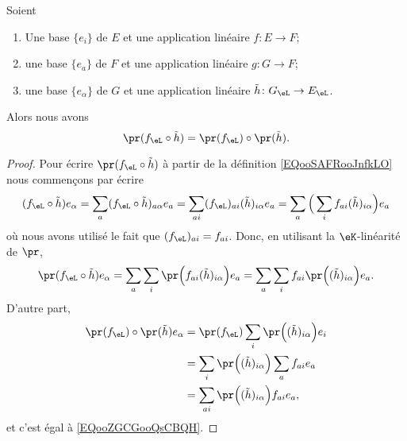 \begin{lemma}       \label{LEMooWZGSooONEnjZ}
    Soient
    \begin{enumerate}
        \item
            Une base \( \{ e_i \}\) de \( E\) et une application linéaire \( f\colon E\to F\);
        \item
            une base \( \{ e_a \}\) de \( F\) et une application linéaire \( g\colon G\to F\);
        \item
            une base \( \{ e_{\alpha} \} \) de \( G\) et une application linéaire \( \tilde h\colon G_{\eL}\to E_{\eL}\).
    \end{enumerate}
    Alors nous avons
    \begin{equation}
        \pr(f_{\eL}\circ \tilde h)=\pr(f_{\eL})\circ\pr(\tilde h).
    \end{equation}
\end{lemma}

\begin{proof}
    Pour écrire \( \pr(f_{\eL}\circ \tilde h)\) à partir de la définition \eqref{EQooSAFRooJnfkLO} nous commençons par écrire
    \begin{equation}
        (f_{\eL}\circ \tilde h)e_{\alpha}=\sum_a(f_{\eL}\circ \tilde h)_{a\alpha}e_a=\sum_{ai}(f_{\eL})_{ai}(\tilde h)_{i\alpha}e_a=\sum_a\Big( \sum_{i}f_{ai}(\tilde h)_{i\alpha} \Big)e_a
    \end{equation}
    où nous avons utilisé le fait que \( (f_{\eL})_{ai}=f_{ai}\). Donc, en utilisant la \( \eK\)-linéarité de \( \pr\),
    \begin{equation}        \label{EQooZGCGooQsCBQH}
        \pr(f_{\eL}\circ \tilde h)e_{\alpha}=\sum_a\sum_i\pr\Big( f_{ai}(\tilde h)_{i\alpha} \Big)e_a=\sum_a\sum_if_{ai}\pr\Big( (\tilde h)_{i\alpha} \Big)e_a.
    \end{equation}
    D'autre part,
    \begin{equation}
        \begin{aligned}[]
            \pr(f_{\eL})\circ \pr(\tilde h)e_{\alpha}&=\pr(f_{\eL})\sum_i\pr\Big( (\tilde h)_{i\alpha} \Big)e_i\\
            &=\sum_i\pr\Big( (\tilde h)_{i\alpha} \Big)\sum_af_{ai}e_a\\
            &=\sum_{ai}\pr\Big( (\tilde h)_{i\alpha} \Big)f_{ai}e_a,
        \end{aligned}
    \end{equation}
    et c'est égal à \eqref{EQooZGCGooQsCBQH}.
\end{proof}

